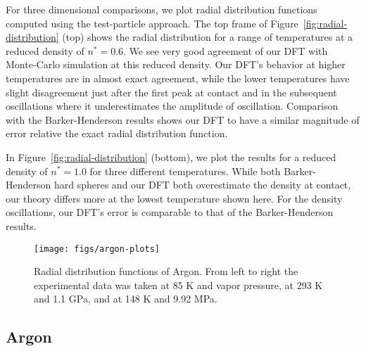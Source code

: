 \documentclass[letterpaper,twocolumn,amsmath,amssymb,prb]{revtex4-1}
\begin{document}
For three dimensional comparisons, we plot radial distribution
functions computed using the test-particle approach.  
The top frame of Figure~\ref{fig:radial-distribution} (top) shows
the radial distribution for a range of temperatures at a reduced
density of $n^* = 0.6$. We see very good agreement of our DFT with
Monte-Carlo simulation at this reduced density. Our DFT's behavior at
higher temperatures are in almost exact agreement, while the lower
temperatures have slight disagreement just after the first peak at
contact and in the subsequent oscillations where it underestimates the
amplitude of oscillation. Comparison with the Barker-Henderson results
shows our DFT to have a similar magnitude of error relative the exact
radial distribution function.

In Figure~\ref{fig:radial-distribution} (bottom), we plot the results
for a reduced density of $n^*=1.0$ for three different
temperatures. While both Barker-Henderson hard spheres and our DFT
both overestimate the density at contact, our theory differs more at
the lowest temperature shown here. For the density oscillations, our
DFT's error is comparable to that of the Barker-Henderson results.
\newline

\begin{figure*}
  \begin{center}
    \texttt{[image: figs/argon-plots]}
  \end{center}
  \caption{Radial distribution functions of Argon. From left to right
    the experimental data was taken at 85 K and vapor pressure, at 293
    K and 1.1 GPa, and at 148 K and 9.92 MPa.}
  \label{fig:argon-plots}
\end{figure*}


\subsection{Argon}
\end{document}
